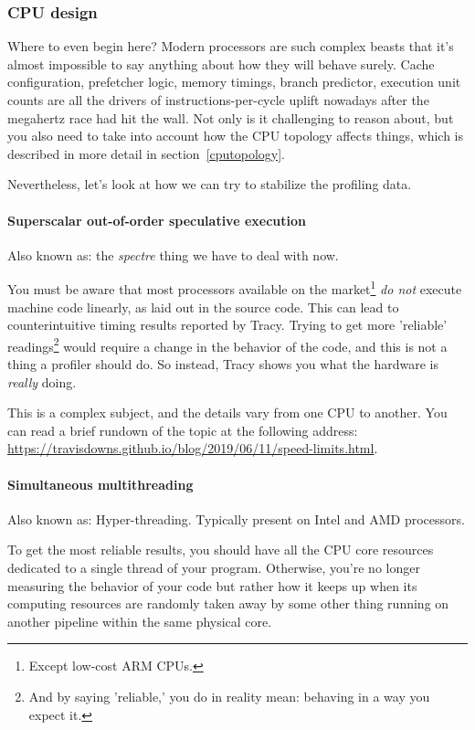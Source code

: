 \documentclass[hidelinks,titlepage,a4paper,twoside]{article}
\begin{document}
\subsubsection{CPU design}
\label{checkenvironmentcpu}

Where to even begin here? Modern processors are such complex beasts that it's almost impossible to say anything about how they will behave surely. Cache configuration, prefetcher logic, memory timings, branch predictor, execution unit counts are all the drivers of instructions-per-cycle uplift nowadays after the megahertz race had hit the wall. Not only is it challenging to reason about, but you also need to take into account how the CPU topology affects things, which is described in more detail in section~\ref{cputopology}.

Nevertheless, let's look at how we can try to stabilize the profiling data.

\paragraph{Superscalar out-of-order speculative execution}

Also known as: the \emph{spectre} thing we have to deal with now.

You must be aware that most processors available on the market\footnote{Except low-cost ARM CPUs.} \emph{do not} execute machine code linearly, as laid out in the source code. This can lead to counterintuitive timing results reported by Tracy. Trying to get more 'reliable' readings\footnote{And by saying 'reliable,' you do in reality mean: behaving in a way you expect it.} would require a change in the behavior of the code, and this is not a thing a profiler should do. So instead, Tracy shows you what the hardware is \emph{really} doing.

This is a complex subject, and the details vary from one CPU to another. You can read a brief rundown of the topic at the following address: \url{https://travisdowns.github.io/blog/2019/06/11/speed-limits.html}.

\paragraph{Simultaneous multithreading}

Also known as: Hyper-threading. Typically present on Intel and AMD processors.

To get the most reliable results, you should have all the CPU core resources dedicated to a single thread of your program. Otherwise, you're no longer measuring the behavior of your code but rather how it keeps up when its computing resources are randomly taken away by some other thing running on another pipeline within the same physical core.
\end{document}
